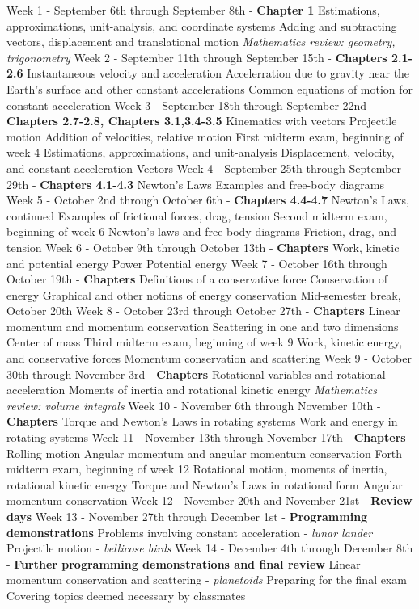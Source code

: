 \documentclass[10pt]{article}
\begin{document}
\begin{outline}[enumerate]
\1 Week 1 - September 6th through September 8th - \textbf{Chapter 1}
\2 Estimations, approximations, unit-analysis, and coordinate systems
\2 Adding and subtracting vectors, displacement and translational motion
\2 \textit{Mathematics review: geometry, trigonometry}
\1 Week 2 - September 11th through September 15th - \textbf{Chapters 2.1-2.6}
\2 Instantaneous velocity and acceleration
\2 Accelerration due to gravity near the Earth's surface and other constant accelerations
\2 Common equations of motion for constant acceleration	
\1 Week 3 - September 18th through September 22nd - \textbf{Chapters 2.7-2.8, Chapters 3.1,3.4-3.5}
\2 Kinematics with vectors
\2 Projectile motion
\2 Addition of velocities, relative motion
\1 First midterm exam, beginning of week 4
\2 Estimations, approximations, and unit-analysis
\2 Displacement, velocity, and constant acceleration
\2 Vectors
\1 Week 4 - September 25th through September 29th - \textbf{Chapters 4.1-4.3}
\2 Newton's Laws
\2 Examples and free-body diagrams
\1 Week 5 - October 2nd through October 6th - \textbf{Chapters 4.4-4.7}
\2 Newton's Laws, continued
\2 Examples of frictional forces, drag, tension
\clearpage
\1 Second midterm exam, beginning of week 6
\2 Newton's laws and free-body diagrams
\2 Friction, drag, and tension
\1 Week 6 - October 9th through October 13th - \textbf{Chapters}
\2 Work, kinetic and potential energy
\2 Power
\2 Potential energy
\1 Week 7 - October 16th through October 19th - \textbf{Chapters}
\2 Definitions of a conservative force
\2 Conservation of energy
\3 Graphical and other notions of energy conservation
\1 Mid-semester break, October 20th
\1 Week 8 - October 23rd through October 27th - \textbf{Chapters}
\2 Linear momentum and momentum conservation
\2 Scattering in one and two dimensions
\2 Center of mass
\1 Third midterm exam, beginning of week 9
\2 Work, kinetic energy, and conservative forces
\2 Momentum conservation and scattering
\1 Week 9 - October 30th through November 3rd - \textbf{Chapters}
\2 Rotational variables and rotational acceleration
\2 Moments of inertia and rotational kinetic energy
\3 \textit{Mathematics review: volume integrals}
\1 Week 10 - November 6th through November 10th - \textbf{Chapters}
\2 Torque and Newton's Laws in rotating systems
\2 Work and energy in rotating systems
\1 Week 11 - November 13th through November 17th - \textbf{Chapters}
\2 Rolling motion
\2 Angular momentum and angular momentum conservation
\1 Forth midterm exam, beginning of week 12
\2 Rotational motion, moments of inertia, rotational kinetic energy
\2 Torque and Newton's Laws in rotational form
\2 Angular momentum conservation
\1 Week 12 - November 20th and November 21st - \textbf{Review days}
\1 Week 13 - November 27th through December 1st  - \textbf{Programming demonstrations}
\2 Problems involving constant acceleration - \textit{lunar lander}
\2 Projectile motion - \textit{bellicose birds}
\1 Week 14 - December 4th through December 8th - \textbf{Further programming demonstrations and final review}
\2 Linear momentum conservation and scattering - \textit{planetoids}
\2 Preparing for the final exam
\2 Covering topics deemed necessary by classmates
\end{outline}
\end{document}
